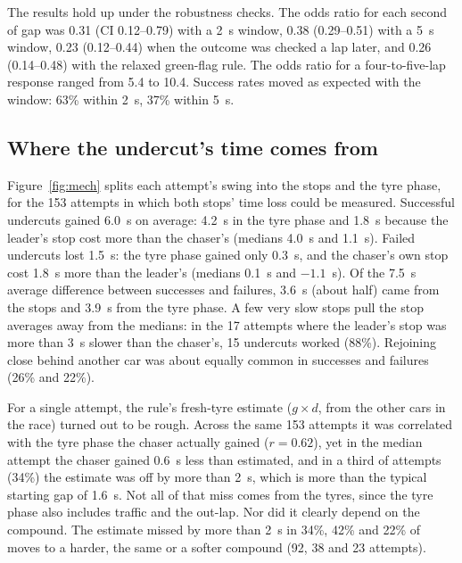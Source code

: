 \documentclass[12pt]{article}
\begin{document}
The results hold up under the robustness checks. %
The odds ratio for each second of gap was 0.31 (CI 0.12--0.79) with a 2~s window, 0.38 (0.29--0.51) with a 5~s window, 0.23 (0.12--0.44) when the outcome was checked a lap later, and 0.26 (0.14--0.48) with the relaxed green-flag rule. The odds ratio for a four-to-five-lap response ranged from 5.4 to 10.4. Success rates moved as expected with the window: 63\% within 2~s, 37\% within 5~s.

\subsection{Where the undercut's time comes from}\label{sec:mech}
Figure~\ref{fig:mech} splits each attempt's swing into the stops and the tyre phase, for the 153 attempts in which both stops' time loss could be measured. %
Successful undercuts gained 6.0~s on average: 4.2~s in the tyre phase and 1.8~s because the leader's stop cost more than the chaser's (medians 4.0~s and 1.1~s). Failed undercuts lost 1.5~s: the tyre phase gained only 0.3~s, and the chaser's own stop cost 1.8~s more than the leader's (medians 0.1~s and $-1.1$~s). Of the 7.5~s average difference between successes and failures, 3.6~s (about half) came from the stops and 3.9~s from the tyre phase. A few very slow stops pull the stop averages away from the medians: in the 17 attempts where the leader's stop was more than 3~s slower than the chaser's, 15 undercuts worked (88\%). Rejoining close behind another car was about equally common in successes and failures (26\% and 22\%).

For a single attempt, the rule's fresh-tyre estimate ($g \times d$, from the other cars in the race) turned out to be rough. Across the same 153 attempts it was correlated with the tyre phase the chaser actually gained ($r=0.62$), yet in the median attempt the chaser gained 0.6~s less than estimated, and in a third of attempts (34\%) the estimate was off by more than 2~s, which is more than the typical starting gap of 1.6~s. Not all of that miss comes from the tyres, since the tyre phase also includes traffic and the out-lap. Nor did it clearly depend on the compound. The estimate missed by more than 2~s in 34\%, 42\% and 22\% of moves to a harder, the same or a softer compound (92, 38 and 23 attempts).
\end{document}
